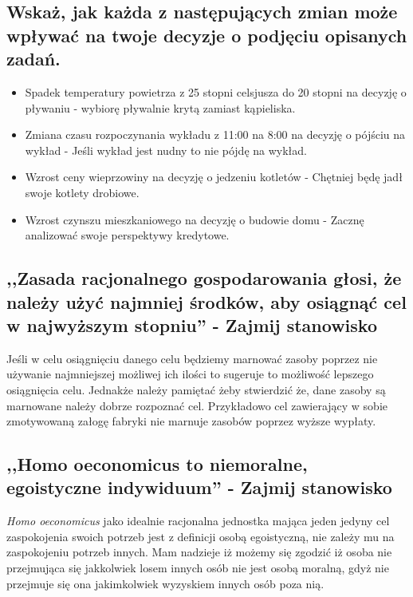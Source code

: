 \documentclass[a4paper,12pt]{article}
\begin{document}
\subsection{Wskaż, jak każda z następujących zmian może wpływać na twoje decyzje o podjęciu opisanych zadań.}

\begin{itemize}
	\item Spadek temperatury powietrza z 25 stopni celsjusza do 20 stopni na decyzję o pływaniu - wybiorę pływalnie krytą zamiast kąpieliska.
	\item Zmiana czasu rozpoczynania wykładu z 11:00 na 8:00 na decyzję o pójściu na wykład - Jeśli wykład jest nudny to nie pójdę na wykład.
	\item Wzrost ceny wieprzowiny na decyzję o jedzeniu kotletów - Chętniej będę jadł swoje kotlety drobiowe.
	\item Wzrost czynszu mieszkaniowego na decyzję o budowie domu - Zacznę analizować swoje perspektywy kredytowe.
\end{itemize}

\subsection{,,Zasada racjonalnego gospodarowania głosi, że należy użyć najmniej środków, aby osiągnąć cel w najwyższym stopniu'' - Zajmij stanowisko}

Jeśli w celu osiągnięciu danego celu będziemy marnować zasoby poprzez nie używanie najmniejszej możliwej ich ilości to sugeruje to możliwość lepszego osiągnięcia celu. Jednakże należy pamiętać żeby stwierdzić że, dane zasoby są marnowane należy dobrze rozpoznać cel. Przykładowo cel zawierający w sobie zmotywowaną załogę fabryki nie marnuje zasobów poprzez wyższe wypłaty.

\subsection{,,Homo oeconomicus to niemoralne, egoistyczne indywiduum'' - Zajmij stanowisko}

\emph{Homo oeconomicus} jako idealnie racjonalna jednostka mająca jeden jedyny cel zaspokojenia swoich potrzeb jest z definicji osobą egoistyczną, nie zależy mu na zaspokojeniu potrzeb innych. Mam nadzieje iż możemy się zgodzić iż osoba nie przejmująca się jakkolwiek losem innych osób nie jest osobą moralną, gdyż nie przejmuje się ona jakimkolwiek wyzyskiem innych osób poza nią.
\end{document}
